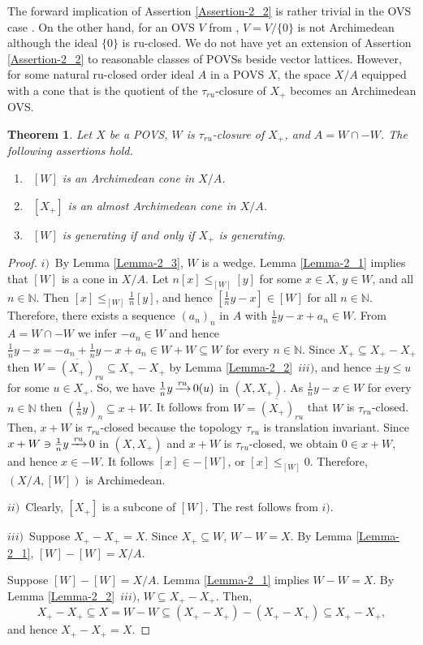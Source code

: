 \documentclass[10pt]{article}
\newtheorem{theorem}{Theorem}[section]
\DeclareMathOperator{\convr}{\xrightarrow[]{{\it ru}}}
\begin{document}
\noindent
The forward implication of Assertion \ref{Assertion-2_2} is rather trivial in the OVS case \cite[Proposition 3.2(a)]{E-2017}.
On the other hand, for an OVS $V$ from \cite[Example 2.5]{E-2017}, $V = V/\{0\}$ is not Archimedean although the ideal $\{0\}$ is ru-closed.
We do not have yet an extension of Assertion \ref{Assertion-2_2} to reasonable classes of POVSs beside vector lattices. 
However, for some natural ru-closed order ideal $A$ in a POVS $X$, the space $X/A$ equipped with a cone that is the quotient of the $\tau_{ru}$-closure of $X_+$ 
becomes an Archimedean OVS.

\begin{theorem}\label{Theorem-2_1}
Let $X$ be a POVS, $W$ is $\tau_{ru}$-closure of $X_+$, and $A=W\cap -W$. 
The following assertions hold.
\begin{enumerate}[$i)$]
\item\
$[W]$ is an Archime\-dean cone in $X/A$. 
\item\
$[X_+]$ is an almost Archime\-dean cone in $X/A$. 
\item\
$[W]$ is generating if and only if $X_+$ is generating.
\end{enumerate}
\end{theorem}

\begin{proof}
$i)$\
By Lemma \ref{Lemma-2_3}, $W$ is a wedge.
Lemma \ref{Lemma-2_1} implies that $[W]$ is a cone in $X/A$. 
Let $n[x]\leqslant_{[W]} [y]$ for some $x\in X$, $y\in W$, and all $n\in\mathbb{N}$.
Then $[x]\leqslant_{[W]}\frac{1}{n}[y]$, and hence $[\frac{1}{n}y-x]\in[W]$ for all $n\in\mathbb{N}$.
Therefore, there exists a sequence $(a_n)_n$ in $A$ with $\frac{1}{n}y-x+a_n\in W$.
From $A=W\cap -W$ we infer $-a_n\in W$ and hence $\frac{1}{n}y-x=-a_n+\frac{1}{n}y-x+a_n\in W+W\subseteq W$
for every $n\in\mathbb{N}$.
Since $X_+\subseteq X_+-X_+$ then $W=\overline{(X_+)}_{ru}\subseteq X_+-X_+$ by Lemma \ref{Lemma-2_2}~$iii)$, 
and hence $\pm y\leqslant u$ for some $u\in X_+$. So, we have $\frac{1}{n}y\convr 0(u)$ in $(X,X_+)$.
As $\frac{1}{n}y-x\in W$ for every $n\in\mathbb{N}$ then $(\frac{1}{n}y)_n\subseteq x+W$. 
It follows from $W=\overline{(X_+)}_{ru}$ that $W$ is $\tau_{ru}$-closed.
Then, $x+W$ is $\tau_{ru}$-closed because the topology $\tau_{ru}$ is translation invariant.
Since $x+W\ni\frac{1}{n}y\convr 0$ in $(X,X_+)$ and $x+W$ is $\tau_{ru}$-closed, we obtain
$0\in x+W$, and hence $x\in -W$.
It follows $[x]\in-[W]$, or $[x]\leqslant_{[W]}0$. Therefore, $(X/A,[W])$ is Archime\-dean.

\medskip
$ii)$\
Clearly, $[X_+]$ is a subcone of $[W]$. The rest follows from $i)$.

\medskip
$iii)$\
Suppose $X_+-X_+=X$. Since $X_+\subseteq W$, $W-W=X$. By Lemma \ref {Lemma-2_1}, $[W]-[W]=X/A$.

\smallskip
Suppose $[W]-[W]=X/A$. Lemma \ref {Lemma-2_1} implies $W-W=X$.
By Lemma \ref{Lemma-2_2}~$iii)$, $W\subseteq X_+-X_+$. Then, 
$$
   X_+-X_+\subseteq X=W-W\subseteq (X_+-X_+)-(X_+-X_+)\subseteq X_+-X_+,
$$
and hence $X_+-X_+=X$.
\end{proof}
\end{document}
